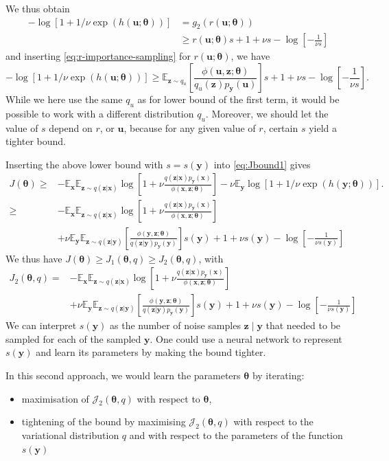 \documentclass[11pt, oneside]{article}
\newcommand{\thetab}{{\boldsymbol{\theta}}}
\newcommand{\pnn}{\phi}
\newcommand{\pnoise}{p_{ \mathbf y}}
\renewcommand{\u}{{\mathbf u}}
\newcommand{\x}{{\mathbf x}}
\newcommand{\y}{{\mathbf y}}
\newcommand{\z}{{\mathbf z}}
\newcommand{\E}{\mathbb{E}}
\newcommand{\Ex}{\E_{\x}}
\newcommand{\Ey}{\E_{\y}}
\newcommand{\J}{\mathcal{J}}
\begin{document}
We thus obtain
\begin{align}
  - \log [1+1/\nu \exp(h(\u;\thetab))] &= g_2(r(\u;\thetab))\\
  &\ge  r(\u;\thetab)s + 1+ \nu s - \log\left[ -\frac{1}{\nu s}\right]
\end{align}
and inserting \eqref{eq:r-importance-sampling} for $r(\u;\thetab)$, we have
\begin{equation}
  - \log [1+1/\nu \exp(h(\u;\thetab))] \ge \E_{\z \sim q_u} \left[\frac{\pnn(\u,\z; \thetab)}{q_u(\z) \pnoise(\u)}\right] s  + 1+ \nu s - \log\left[ -\frac{1}{\nu s}\right].
\end{equation}
While we here use the same $q_u$ as for lower bound of the first term, it would be possible to work with a different distribution $q_u$. Moreover, we should let the value of $s$ depend on $r$, or $\u$, because for any given value of $r$, certain $s$ yield a tighter bound.

Inserting the above lower bound with $s=s(\y)$ into \eqref{eq:Jbound1} gives
\begin{align}
  J(\thetab)  \ge&  -\Ex \E_{\z \sim q(\z|\x)} \log \left[1+\nu \frac{q(\z|\x)\pnoise(\x)}{\pnn(\x,\z; \thetab)}\right] -  \nu \Ey \log \left[1+1/\nu \exp(h(\y;\thetab))\right].\\
  \ge&  -\Ex \E_{\z \sim q(\z|\x)} \log \left[1+\nu \frac{q(\z|\x)\pnoise(\x)}{\pnn(\x,\z; \thetab)}\right] \nonumber \\
  &+  \nu \Ey \E_{\z \sim q(\z|\y)} \left[\frac{\pnn(\y,\z; \thetab)}{q(\z|\y) \pnoise(\y)}\right]s(\y)  + 1+ \nu s(\y) - \log\left[ -\frac{1}{\nu s(\y)}\right]
\end{align}
We thus have $J(\thetab) \ge J_1(\thetab,q) \ge J_2(\thetab,q)$, with
\begin{align}
  J_2(\thetab,q) =&  -\Ex \E_{\z \sim q(\z|\x)} \log \left[1+\nu \frac{q(\z|\x)\pnoise(\x)}{\pnn(\x,\z; \thetab)}\right] \nonumber \\
  &+  \nu \Ey \E_{\z \sim q(\z|\y)} \left[\frac{\pnn(\y,\z; \thetab)}{q(\z|\y) \pnoise(\y)}\right]s(\y)  + 1+ \nu s(\y) - \log\left[ -\frac{1}{\nu s(\y)}\right]
  \label{eq:J2-def}
\end{align}
We can interpret $s(\y)$ as the number of noise samples $\z \mid \y$
that needed to be sampled for each of the sampled $\y$. One could use
a neural network to represent $s(\y)$ and learn its parameters by
making the bound tighter.

In this second approach, we would learn the parameters $\thetab$ by iterating:
\begin{itemize}
\item maximisation of $\J_2(\thetab,q)$ with respect to $\thetab$,
\item tightening of the bound by maximising $\J_2(\thetab,q)$ with respect to the variational distribution $q$ and with respect to the parameters of the function $s(\y)$
\end{itemize}
\end{document}
